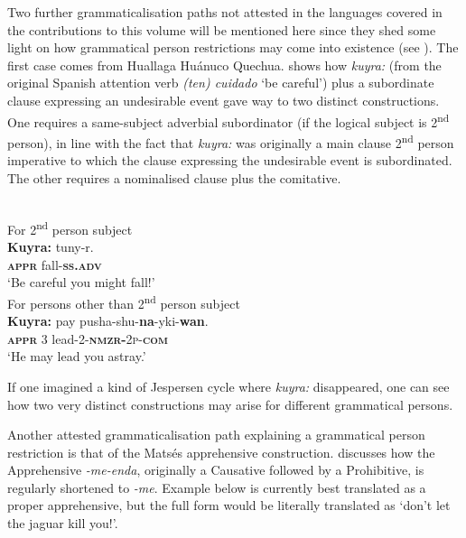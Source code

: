 \documentclass[output=paper,colorlinks,citecolor=brown
]{langscibook}
\begin{document}
Two further grammaticalisation paths not attested in the languages covered in the contributions to this volume will be mentioned here since they shed some light on how grammatical person restrictions may come into existence (see ). The first case comes from Huallaga Huánuco Quechua. \citet[304]{weber1989} shows how \textit{kuyra:} (from the original Spanish attention verb \textit{(ten) cuidado} `be careful') plus a subordinate clause expressing an undesirable event gave way to two distinct constructions. One  requires a same-subject adverbial subordinator (if the logical subject is 2\textsuperscript{nd} person), in line with the fact that \textit{kuyra:} was originally a main clause 2\textsuperscript{nd} person imperative to which the clause expressing the undesirable event is subordinated. The other  requires a nominalised clause plus the comitative.


\ea \label{ex:intro26} 
\\
\ea \label{ex:intro26a} \textnormal{For 2\textsuperscript{nd} person subject} \\
\gll \textbf{Kuyra:} tuny-r. \\
\textbf{\textsc{appr}} fall-\textsc{\textbf{ss.adv}} \\
\glt `Be careful you might fall!' \\
\ex \label{ex:intro26b} \textnormal{For persons other than 2\textsuperscript{nd} person subject} \\
\gll \textbf{Kuyra:} pay	pusha-shu-\textbf{na}-yki-\textbf{wan}. \\
\textbf{\textsc{appr}} 3 lead-2-\textsc{\textbf{nmzr-}2p-\textbf{com}} \\
\glt `He may lead you astray.'
\z
\z

\noindent If one imagined a kind of Jespersen cycle where \textit{kuyra:} disappeared, one can see how two very distinct constructions may arise for different grammatical persons.

Another attested grammaticalisation path explaining a grammatical person restriction is that of the Matsés apprehensive construction. \citet[443]{fleck2003} discusses how the Apprehensive \textit{-me-enda}, originally a Causative followed by a Prohibitive, is regularly shortened to \textit{-me}. Example  below is currently best translated as a proper apprehensive, but the full form would be literally translated as `don't let the jaguar kill you!'.
\end{document}
